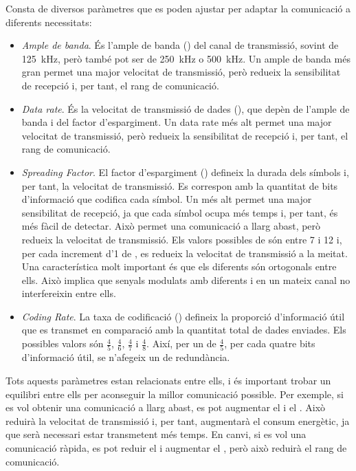 \documentclass{tfgitic}[2024/07/01]
\begin{document}
Consta de diversos paràmetres que es poden ajustar per adaptar la comunicació a diferents necessitats:
\begin{itemize}
    \item \emph{Ample de banda}. És l'ample de banda () del canal de transmissió, sovint de \SI{125}{\kHz}, però també pot ser de \SI{250}{\kHz} o \SI{500}{\kHz}. Un ample de banda més gran permet una major velocitat de transmissió, però redueix la sensibilitat de recepció i, per tant, el rang de comunicació.
    \item \emph{Data rate}. És la velocitat de transmissió de dades (), que depèn de l'ample de banda i del factor d'espargiment. Un data rate més alt permet una major velocitat de transmissió, però redueix la sensibilitat de recepció i, per tant, el rang de comunicació.
    \item \emph{Spreading Factor}. El factor d'espargiment () defineix la durada dels símbols i, per tant, la velocitat de transmissió. Es correspon amb la quantitat de bits d'informació que codifica cada símbol. Un  més alt permet una major sensibilitat de recepció, ja que cada símbol ocupa més temps i, per tant, és més fàcil de detectar. Això permet una comunicació a llarg abast, però redueix la velocitat de transmissió. Els valors possibles de  són entre 7 i 12 i, per cada increment d'1 de , es redueix la velocitat de transmissió a la meitat. Una característica molt important és que els diferents  són ortogonals entre ells. Això implica que senyals modulats amb diferents  i en un mateix canal no interfereixin entre ells. 
    \item \emph{Coding Rate}. La taxa de codificació () defineix la proporció d'informació útil que es transmet en comparació amb la quantitat total de dades enviades. Els possibles valors són $\frac{4}{5}$, $\frac{4}{6}$, $\frac{4}{7}$ i $\frac{4}{8}$. Així, per un  de $\frac{4}{5}$, per cada quatre bits d'informació útil, se n'afegeix un de redundància.
\end{itemize}

Tots aquests paràmetres estan relacionats entre ells, i és important trobar un equilibri entre ells per aconseguir la millor comunicació possible. Per exemple, si es vol obtenir una comunicació a llarg abast, es pot augmentar el  i el . Això reduirà la velocitat de transmissió i, per tant, augmentarà el consum energètic, ja que serà necessari estar transmetent més temps. En canvi, si es vol una comunicació ràpida, es pot reduir el  i augmentar el , però això reduirà el rang de comunicació.
\end{document}
